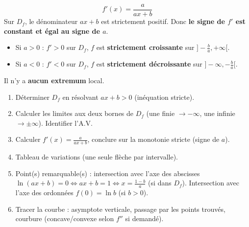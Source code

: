\documentclass[11pt]{article}
\begin{document}
\begin{propriete}
\[ f'(x) = \frac{a}{ax+b} \]
Sur $D_f$, le dénominateur $ax+b$ est strictement positif. Donc \textbf{le signe de $f'$ est constant et égal au signe de $a$}.
\begin{itemize}
  \item Si $a > 0$ : $f' > 0$ sur $D_f$, $f$ est \textbf{strictement croissante} sur $]-\frac{b}{a}, +\infty[$.
  \item Si $a < 0$ : $f' < 0$ sur $D_f$, $f$ est \textbf{strictement décroissante} sur $]-\infty, -\frac{b}{a}[$.
\end{itemize}
Il n'y a \textbf{aucun extremum} local.
\end{propriete}

\begin{methode}[Étude complète de $f(x) = \ln(ax+b)$]
\begin{enumerate}
  \item Déterminer $D_f$ en résolvant $ax+b > 0$ (inéquation stricte).
  \item Calculer les limites aux deux bornes de $D_f$ (une finie $\to -\infty$, une infinie $\to \pm\infty$). Identifier l'A.V.
  \item Calculer $f'(x) = \frac{a}{ax+b}$, conclure sur la monotonie stricte (signe de $a$).
  \item Tableau de variations (une seule flèche par intervalle).
  \item Point(s) remarquable(s) : intersection avec l'axe des abscisses $\ln(ax+b)=0 \iff ax+b=1 \iff x=\frac{1-b}{a}$ (si dans $D_f$). Intersection avec l'axe des ordonnées $f(0)=\ln b$ (si $b>0$).
  \item Tracer la courbe : asymptote verticale, passage par les points trouvés, courbure (concave/convexe selon $f''$ si demandé).
\end{enumerate}
\end{methode}
\end{document}
